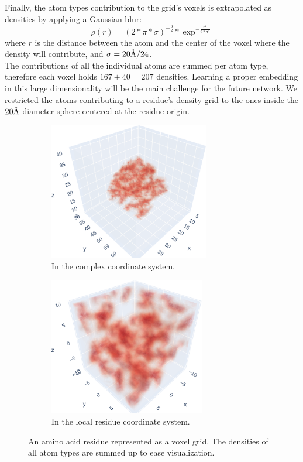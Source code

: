 \documentclass{article}
\newcommand{\angstrom}{\textup{\AA}}
\begin{document}
Finally, the atom types contribution to the grid's voxels is extrapolated as densities by applying a Gaussian blur:
$$
\rho(r) = (2*\pi*\sigma)^{-\frac{3}{2}} * \exp^{-\frac{r^2}{2*\sigma^2}}
$$
where $r$ is the distance between the atom and the center of the voxel where the density will contribute, and $\sigma = 20\angstrom / 24$. \\
The contributions of all the individual atoms are summed per atom type, therefore each voxel holds $167 + 40 = 207$ densities. Learning a proper embedding in this large dimensionality will be the main challenge for the future network. We restricted the atoms contributing to a residue's density grid to the ones inside the $20 \angstrom$ diameter sphere centered at the residue origin.
\begin{figure}[H]
    \centering
    \begin{subfigure}{.5\textwidth}
        \centering
        \includegraphics[height=6cm,width=\textwidth,keepaspectratio]{res_grid_comp.png}
        \caption{In the complex coordinate system.}
        \label{fig:res_grid_comp}
    \end{subfigure}%
    \begin{subfigure}{.5\textwidth}
        \centering
        \includegraphics[height=6cm,width=\textwidth,keepaspectratio]{res_grid_res.png}
        \caption{In the local residue coordinate system.}
        \label{fig:res_grid_res}
    \end{subfigure}
    \caption{An amino acid residue represented as a voxel grid. The densities of all atom types are summed up to ease visualization.}
    \label{fig:residue_grid}
\end{figure}
\end{document}
